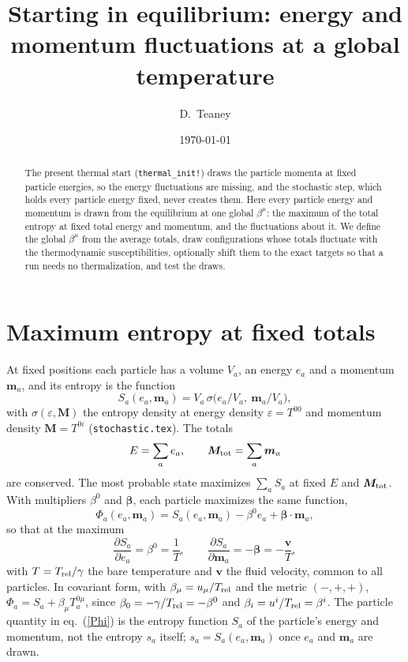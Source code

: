 \documentclass[11pt,aps,preprint,nofootinbib,superscriptaddress,tightenlines]{revtex4-2}
\def\st{\begin{equation}}
\def\stp{\end{equation}}
\def\Eq#1{eq.~(\ref{#1})}
\begin{document}
\title{Starting in equilibrium: energy and momentum fluctuations at a global temperature}
\author{D.~Teaney}
\date{\today}

\begin{abstract}
The present thermal start (\texttt{thermal\_init!}) draws the particle momenta at fixed
particle energies, so the energy fluctuations are missing, and the stochastic step,
which holds every particle energy fixed, never creates them.  Here every particle
energy and momentum is drawn from the equilibrium at one global $\beta^\mu$: the
maximum of the total entropy at fixed total energy and momentum, and the fluctuations
about it.  We define the global $\beta^\mu$ from the average totals, draw configurations
whose totals fluctuate with the thermodynamic susceptibilities, optionally shift them
to the exact targets so that a run needs no thermalization, and test the draws.
\end{abstract}

\maketitle

\section{Maximum entropy at fixed totals}
\label{sec:max}

At fixed positions each particle has a volume $V_a$, an energy $e_a$ and a momentum
$\bm m_a$, and its entropy is the function
\st
S_a(e_a,\bm m_a)=V_a\,\sigma\big(e_a/V_a,\ \bm m_a/V_a\big),
\stp
with $\sigma(\varepsilon,\bm M)$ the entropy density at energy density $\varepsilon=T^{00}$ and
momentum density $\bm M=T^{0i}$ (\texttt{stochastic.tex}).  The totals
\st
E=\sum_ae_a,\qquad \bm M_{\rm tot}=\sum_a\bm m_a
\stp
are conserved.  The most probable state maximizes $\sum_aS_a$ at fixed $E$ and
$\bm M_{\rm tot}$.  With multipliers $\beta^0$ and $\bm\beta$, each particle maximizes the same
function,
\st
\Phi_a(e_a,\bm m_a)=S_a(e_a,\bm m_a)-\beta^0e_a+\bm\beta\cdot\bm m_a ,
\label{Phi}
\stp
so that at the maximum
\st
\frac{\partial S_a}{\partial e_a}=\beta^0=\frac1T,\qquad
\frac{\partial S_a}{\partial\bm m_a}=-\bm\beta=-\frac{\bm v}{T} ,
\label{stat}
\stp
with $T=T_{\rm rel}/\gamma$ the bare temperature and $\bm v$ the fluid velocity, common
to all particles.  In covariant form, with $\beta_\mu=u_\mu/T_{\rm rel}$ and the metric
$(-,+,+)$, $\Phi_a=S_a+\beta_\mu T^{0\mu}_a$, since $\beta_0=-\gamma/T_{\rm rel}=-\beta^0$ and
$\beta_i=u^i/T_{\rm rel}=\beta^i$.  The particle quantity in \Eq{Phi} is the entropy
function $S_a$ of the particle's energy and momentum, not the entropy $s_a$ itself;
$s_a=S_a(e_a,\bm m_a)$ once $e_a$ and $\bm m_a$ are drawn.
\end{document}
